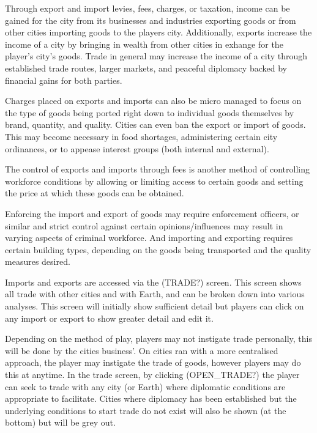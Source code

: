 Through export and import levies, fees, charges, or taxation, income can be gained for the city from its businesses and industries exporting goods or from other cities importing goods to the players city. Additionally, exports increase the income of a city by bringing in wealth from other cities in exhange for the player's city's goods. Trade in general may increase the income of a city through established trade routes, larger markets, and peaceful diplomacy backed by financial gains for both parties. 

Charges placed on exports and imports can also be micro managed to focus on the type of goods being ported right down to individual goods themselves by brand, quantity, and quality. Cities can even ban the export or import of goods. This may become necessary in food shortages, administering certain city ordinances, or to appease interest groups (both internal and external). 

The control of exports and imports through fees is another method of controlling workforce conditions by allowing or limiting access to certain goods and setting the price at which these goods can be obtained.

Enforcing the import and export of goods may require enforcement officers, or similar and strict control against certain opinions/influences may result in varying aspects of criminal workforce. And importing and exporting requires certain building types, depending on the goods being transported and the quality measures desired. 

Imports and exports are accessed via the (TRADE?) screen. This screen shows all trade with other cities and with Earth, and can be broken down into various analyses. This screen will initially show sufficient detail but players can click on any import or export to show greater detail and edit it. 

Depending on the method of play, players may not instigate trade personally, this will be done by the cities business'. On cities ran with a more centralised approach, the player may instigate the trade of goods, however players may do this at anytime. In the trade screen, by clicking (OPEN_TRADE?) the player can seek to trade with any city (or Earth) where diplomatic conditions are appropriate to facilitate. Cities where diplomacy has been established but the underlying conditions to start trade do not exist will also be shown (at the bottom) but will be grey out.  


